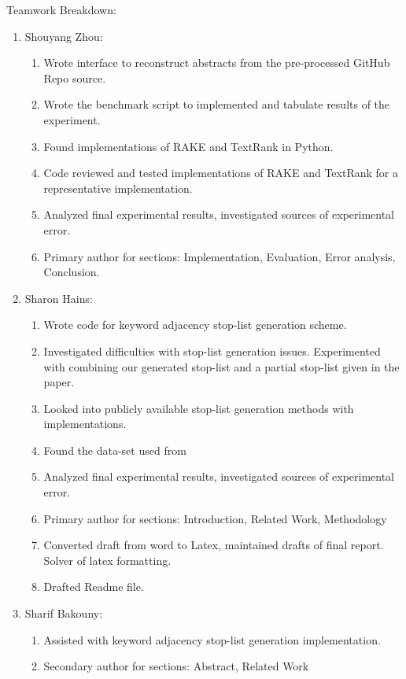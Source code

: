 \documentclass[11pt,a4paper]{article}
\begin{document}
Teamwork Breakdown: 
\begin{enumerate}
	\small \itemsep0em 

	\item Shouyang Zhou:
	\begin{enumerate}
		\item Wrote interface to reconstruct abstracts from the pre-processed GitHub Repo source.
		\item Wrote the benchmark script to implemented and tabulate results of the experiment.
		\item Found implementations of RAKE and TextRank in Python.
		\item Code reviewed and tested implementations of RAKE and TextRank for a representative implementation.
		\item Analyzed final experimental results, investigated sources of experimental error.
		\item Primary author for sections: Implementation, Evaluation, Error analysis, Conclusion.

	\end{enumerate}

	\item Sharon Hains:
	\begin{enumerate}
		\item Wrote code for keyword adjacency stop-list generation scheme.
		\item Investigated difficulties with stop-list generation issues. Experimented with combining our generated stop-list and a partial stop-list given in the paper.
		\item Looked into publicly available stop-list generation methods with implementations. 
		\item Found the data-set used from \citet{hulth-2003-improved}
		\item Analyzed final experimental results, investigated sources of experimental error.
		\item Primary author for sections: Introduction, Related Work, Methodology
		\item Converted draft from word to Latex, maintained drafts of final report. Solver of latex formatting.
		\item Drafted Readme file.
	\end{enumerate}

	\item Sharif Bakouny:
	\begin{enumerate}
		\item Assisted with keyword adjacency stop-list generation implementation.
		\item Secondary author for sections: Abstract, Related Work
	\end{enumerate}	

\normalsize
\end{enumerate}  
 
\end{document}
